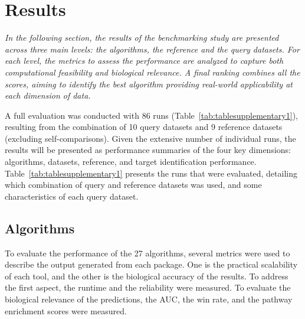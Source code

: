 ﻿%

%


\chapter{Results}
\label{cha:results}

\textit{In the following section, the results of the benchmarking study are presented across three main levels: the algorithms, the reference and the query datasets. For each level, the metrics to assess the performance are analyzed to capture both computational feasibility and biological relevance. A final ranking combines all the scores, aiming to identify the best algorithm providing real-world applicability at each dimension of data.}

\par

A full evaluation was conducted with 86 runs (Table~\ref{tab:tablesupplementary1}), resulting from the combination of 10 query datasets and 9 reference datasets (excluding self-comparisons). Given the extensive number of individual runs, the results will be presented as performance summaries of the four key dimensions: algorithms, datasets, reference, and target identification performance. Table~\ref{tab:tablesupplementary1} presents the runs that were evaluated, detailing which combination of query and reference datasets was used, and some characteristics of each query dataset.

\section{Algorithms} %
\label{sec:algorithmsresults}

To evaluate the performance of the 27 algorithms, several metrics were used to describe the output generated from each package.
One is the practical scalability of each tool, and the other is the biological accuracy of the results.
To address the first aspect, the runtime and the reliability were measured.
To evaluate the biological relevance of the predictions, the \gls{AUC}, the win rate, and the pathway enrichment scores were measured.

